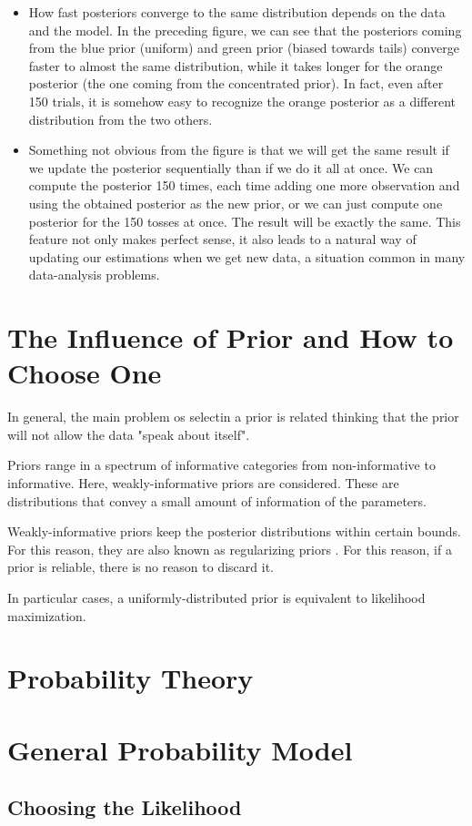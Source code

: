 \begin{example}
\begin{itemize}
        \item How fast posteriors converge to the same distribution depends on the data and the model. In the preceding figure, we can see that the posteriors coming from the blue prior (uniform) and green prior (biased towards tails) converge faster to almost the same distribution, while it takes longer for the orange posterior (the one coming from the concentrated prior). In fact, even after 150 trials, it is somehow easy to recognize the orange posterior as a different distribution from the two others.
        
        \item Something not obvious from the figure is that we will get the same result if we update the posterior sequentially than if we do it all at once. We can compute the posterior 150 times, each time adding one more observation and using the obtained posterior as the new prior, or we can just compute one posterior for the 150 tosses at once. The result will be exactly the same. This feature not only makes perfect sense, it also leads to a natural way of updating our estimations when we get new data, a situation common in many data-analysis problems.\qedhere
    \end{itemize}
        

\end{example}

\section{The Influence of Prior and How to Choose One}

In general, the main problem os selectin a prior is related thinking that the prior will not allow the data "speak about itself". 

Priors range in a spectrum of informative categories from non-informative to informative. Here, weakly-informative  priors are considered. These are distributions that convey a small amount of information of the parameters.

Weakly-informative priors keep the posterior distributions within certain bounds. For this reason, they are also known as regularizing priors . For this reason, if a prior is reliable, there is no reason to discard it.

In particular cases, a uniformly-distributed prior is equivalent to likelihood maximization.

\section{Probability Theory}

\section{General Probability Model}

\subsection{Choosing the Likelihood}

\clearpage
\printbibliography[segment=\therefsegment,heading=subbibintoc]